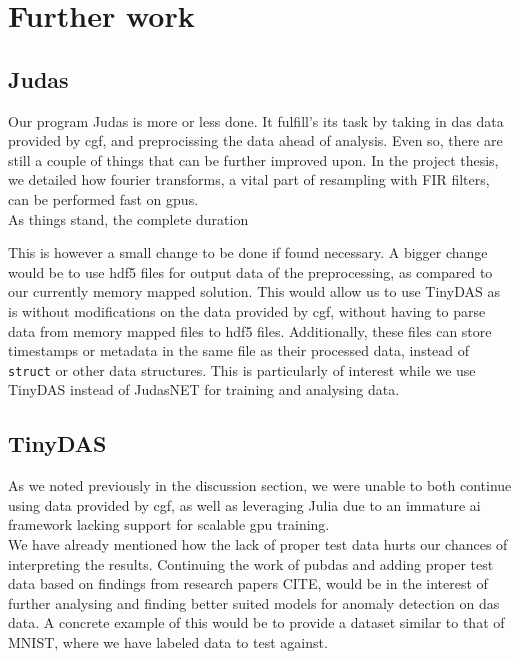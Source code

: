 \section{Further work}
\label{conc:further}

\subsection{Judas}

Our program Judas is more or less done. It fulfill's its task by taking in \acrshort{das} data provided by \acrshort{cgf}, and preprocissing the data ahead of analysis. Even so, there are still a couple of things that can be further improved upon. In the project thesis, we detailed how fourier transforms, a vital part of resampling with FIR filters, can be performed fast on \acrshort{gpu}s. \\

As things stand, the complete duration

This is however a small change to be done if found necessary. A bigger change would be to use \acrshort{hdf5} files for output data of the preprocessing, as compared to our currently memory mapped solution. This would allow us to use TinyDAS as is without modifications on the data provided by \acrshort{cgf}, without having to parse data from memory mapped files to \acrshort{hdf5} files. Additionally, these files can store timestamps or metadata in the same file as their processed data, instead of \texttt{struct} or other data structures. This is particularly of interest while we use TinyDAS instead of JudasNET for training and analysing data.

\subsection{TinyDAS}

As we noted previously in the discussion section, we were unable to both continue using data provided by \acrshort{cgf}, as well as leveraging Julia due to an immature \acrshort{ai} framework lacking support for scalable \acrshort{gpu} training. \\

We have already mentioned how the lack of proper test data hurts our chances of interpreting the results. Continuing the work of \Gls{pubdas} and adding proper test data based on findings from research papers CITE, would be in the interest of further analysing and finding better suited models for anomaly detection on \acrshort{das} data. A concrete example of this would be to provide a dataset similar to that of MNIST, where we have labeled data to test against. \\

